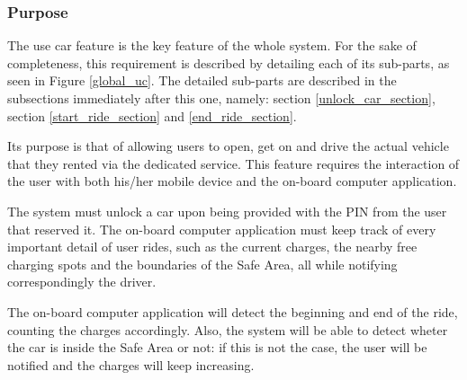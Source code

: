 \subsubsection{Purpose}
The use car feature is the key feature of the whole system. For the sake of completeness, this requirement is described by detailing each of its sub-parts, as seen in Figure \ref{global_uc}.
The detailed sub-parts are described in the subsections immediately after this one, namely: section \ref{unlock_car_section}, section \ref{start_ride_section} and \ref{end_ride_section}.

Its purpose is that of allowing users to open, get on and drive the actual vehicle that they rented via the dedicated service. This feature requires the interaction of the user with both his/her mobile device and the on-board computer application.

The system must unlock a car upon being provided with the PIN from the user that reserved it. The on-board computer application must keep track of every important detail of user rides, such as the current charges, the nearby free charging spots and the boundaries of the Safe Area, all while notifying correspondingly the driver.

The on-board computer application will detect the beginning and end of the ride, counting the charges accordingly. Also, the system will be able to detect wheter the car is inside the Safe Area or not: if this is not the case, the user will be notified and the charges will keep increasing.